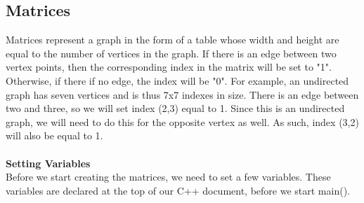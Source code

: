 \documentclass{article}
\begin{document}
\subsection{Matrices}
Matrices represent a graph in the form of a table whose width and height are equal to the number of vertices in the graph. If there is an edge between two vertex points, then the corresponding index in the matrix will be set to "1". Otherwise, if there if no edge, the index will be "0". For example, an undirected graph has seven vertices and is thus 7x7 indexes in size. There is an edge between two and three, so we will set index (2,3) equal to 1. Since this is an undirected graph, we will need to do this for the opposite vertex as well. As such, index (3,2) will also be equal to 1. \\ \\
\textbf{Setting Variables} \\
Before we start creating the matrices, we need to set a few variables. These variables are declared at the top of our C++ document, before we start main(). \\
\end{document}
